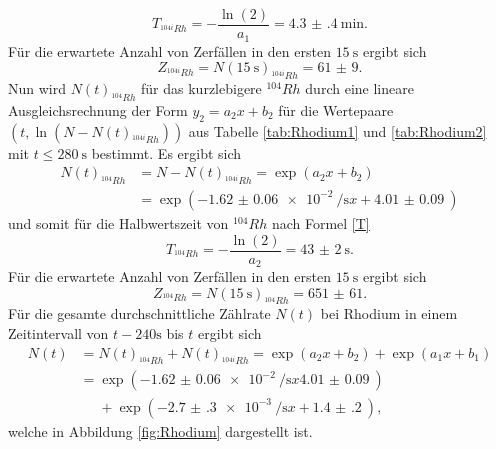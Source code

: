 \begin{equation}
	T_{^{104i}Rh} = -\frac{\ln(2)}{a_1}=\SI{4.3(4)}{\minute}\text{.}
\end{equation}
Für die erwartete Anzahl von Zerfällen in den ersten $\SI{15}{\second}$ ergibt sich
\begin{equation}
	Z_{^{104i}Rh} = N(\SI{15}{\second})_{^{104i}Rh}=\num{61(9)}\text{.}
\end{equation}
Nun wird $N(t)_{^{104}Rh}$ für das kurzlebigere $^{104} Rh$ durch eine lineare Ausgleichsrechnung der Form $y_2=a_2 x+b_2$ für die Wertepaare $(t,\ln(N-N(t)_{^{104i}Rh}))$ aus Tabelle \ref{tab:Rhodium1} und \ref{tab:Rhodium2}  mit $t\le \SI{280}{\second}$ bestimmt.
Es ergibt sich
\begin{align}
N(t)_{^{104}Rh} &= N-N(t)_{^{104i}Rh} = \exp\left(a_2 x + b_2\right) \\
 &= \exp\left(-\SI{1.62(6)e-2}{\per\second} x + \SI{4.01(9)}{}\right)
\end{align}
und somit für die Halbwertszeit von $^{104} Rh$ nach Formel \eqref{T}
\begin{equation}
T_{^{104}Rh} = -\frac{\ln(2)}{a_2}=\SI{43(2)}{\second}\text{.}
\end{equation}
Für die erwartete Anzahl von Zerfällen in den ersten $\SI{15}{\second}$ ergibt sich
\begin{equation}
Z_{^{104}Rh} = N(\SI{15}{\second})_{^{104}Rh}=\num{651(61)}\text{.}
\end{equation}
Für die gesamte durchschnittliche Zählrate $N(t)$ bei Rhodium in einem Zeitintervall von $t-240\si{\second}$ bis $t$ ergibt sich
\begin{align}
N(t)&=N(t)_{^{104}Rh}+N(t)_{^{104i}Rh} =  \exp\left(a_2 x + b_2\right)+\exp\left(a_1 x + b_1\right) \\
&= \exp\left(-\SI{1.62(6)e-2}{\per\second} x \SI{4.01(9)}{}\right) \\
&\phantom{=}+\exp\left(-\SI{2.7(3)e-3}{\per\second} x + \SI{1.4(2)}{}\right)\text{,}
\end{align}
welche in Abbildung \ref{fig:Rhodium} dargestellt ist.

